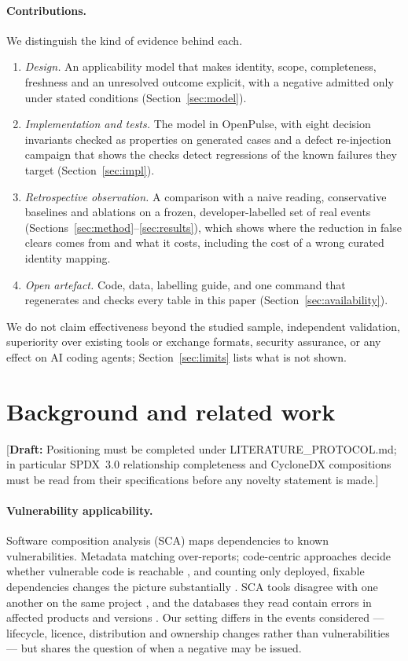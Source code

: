 \documentclass[11pt]{article}
\newcommand{\draftnote}[1]{\textcolor{red!70!black}{[\textbf{Draft:} #1]}}
\begin{document}
\paragraph{Contributions.} We distinguish the kind of evidence behind each.
\begin{enumerate}[nosep]
  \item \emph{Design.} An applicability model that makes identity, scope,
  completeness, freshness and an unresolved outcome explicit, with a negative
  admitted only under stated conditions (Section~\ref{sec:model}).
  \item \emph{Implementation and tests.} The model in OpenPulse, with eight
  decision invariants checked as properties on generated cases and a defect
  re-injection campaign that shows the checks detect regressions of the
  known failures they target (Section~\ref{sec:impl}).
  \item \emph{Retrospective observation.} A comparison with a naive reading,
  conservative baselines and ablations on a frozen, developer-labelled set of
  real events (Sections~\ref{sec:method}--\ref{sec:results}), which shows
  where the reduction in false clears comes from and what it costs,
  including the cost of a wrong curated identity mapping.
  \item \emph{Open artefact.} Code, data, labelling guide, and one command
  that regenerates and checks every table in this paper
  (Section~\ref{sec:availability}).
\end{enumerate}
We do not claim effectiveness beyond the studied sample, independent
validation, superiority over existing tools or exchange formats, security
assurance, or any effect on AI coding agents; Section~\ref{sec:limits} lists
what is not shown.

\section{Background and related work}
\label{sec:related}

\draftnote{Positioning must be completed under LITERATURE\_PROTOCOL.md; in
particular SPDX~3.0 relationship completeness and CycloneDX compositions must
be read from their specifications before any novelty statement is made.}

\paragraph{Vulnerability applicability.} Software composition analysis (SCA)
maps dependencies to known vulnerabilities. Metadata matching over-reports;
code-centric approaches decide whether vulnerable code is reachable
\cite{ponta2018beyond,ponta2020detection}, and counting only deployed,
fixable dependencies changes the picture substantially
\cite{pashchenko2018vulnerable}. SCA tools disagree with one another on the
same project \cite{imtiaz2021comparative}, and the databases they read contain
errors in affected products and versions \cite{anwar2022cleaning}. Our setting
differs in the events considered --- lifecycle, licence, distribution and
ownership changes rather than vulnerabilities --- but shares the question of
when a negative may be issued.
\end{document}
